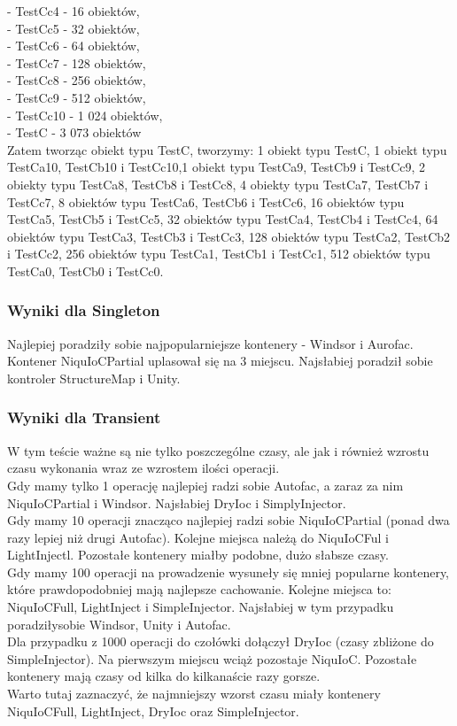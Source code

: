 \documentclass[12pt]{article}
\begin{document}
- TestCc4 - 16 obiektów,\\
- TestCc5 - 32 obiektów,\\
- TestCc6 - 64 obiektów,\\
- TestCc7 - 128 obiektów,\\
- TestCc8 - 256 obiektów,\\
- TestCc9 - 512 obiektów,\\
- TestCc10 - 1 024 obiektów,\\
- TestC - 3 073 obiektów\\
Zatem tworząc obiekt typu TestC, tworzymy: 1 obiekt typu TestC, 1 obiekt typu TestCa10, TestCb10 i TestCc10,1 obiekt typu TestCa9, TestCb9 i TestCc9, 2 obiekty typu TestCa8, TestCb8 i TestCc8, 4 obiekty typu TestCa7, TestCb7 i TestCc7, 8 obiektów typu TestCa6, TestCb6 i TestCc6, 16 obiektów typu TestCa5, TestCb5 i TestCc5, 32 obiektów typu TestCa4, TestCb4 i TestCc4, 64 obiektów typu TestCa3, TestCb3 i TestCc3, 128 obiektów typu TestCa2, TestCb2 i TestCc2, 256 obiektów typu TestCa1, TestCb1 i TestCc1, 512 obiektów typu TestCa0, TestCb0 i TestCc0.

\subsubsection{Wyniki dla Singleton}
Najlepiej poradziły sobie najpopularniejsze kontenery - Windsor i Aurofac. Kontener NiquIoCPartial uplasował się na 3 miejscu. Najsłabiej poradził sobie kontroler StructureMap i Unity.

\subsubsection{Wyniki dla Transient}
W tym teście ważne są nie tylko poszczególne czasy, ale jak i również wzrostu czasu wykonania wraz ze wzrostem ilości operacji.\\
Gdy mamy tylko 1 operację najlepiej radzi sobie Autofac, a zaraz za nim NiquIoCPartial i Windsor. Najsłabiej DryIoc i SimplyInjector.\\
Gdy mamy 10 operacji znacząco najlepiej radzi sobie NiquIoCPartial (ponad dwa razy lepiej niż drugi Autofac). Kolejne miejsca należą do NiquIoCFul i LightInjectl. Pozostałe kontenery miałby podobne, dużo słabsze czasy.\\
Gdy mamy 100 operacji na prowadzenie wysuneły się mniej popularne kontenery, które prawdopodobniej mają najlepsze cachowanie. Kolejne miejsca to: NiquIoCFull, LightInject i SimpleInjector. Najsłabiej w tym przypadku poradziłysobie Windsor, Unity i Autofac.\\
Dla przypadku z 1000 operacji do czołówki dołączył DryIoc (czasy zbliżone do SimpleInjector). Na pierwszym miejscu wciąż pozostaje NiquIoC. Pozostałe kontenery mają czasy od kilka do kilkanaście razy gorsze.\\
Warto tutaj zaznaczyć, że najmniejszy wzorst czasu miały kontenery NiquIoCFull, LightInject, DryIoc oraz SimpleInjector.
\end{document}
